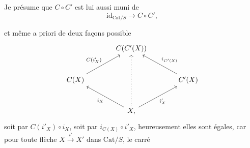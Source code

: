 \documentclass[11pt]{article}
\newcommand{\msp}[1]{\marginpar{\footnotesize [#1]}}
\newcommand{\Cat}{\mathrm{Cat}}
\begin{document}
Je présume que $C \circ C'$ est lui aussi muni de
\[
\mathrm{id}_{\Cat/S} \longrightarrow C \circ C',
\]

\msp{page 197}
et même a priori de deux façons possible
\[
\begin{tikzcd}[column sep=large, row sep=large]
& C(C'(X)) & \\
C(X) \arrow[ur, "C(i'_X)"] & & C'(X) \arrow[ul, "i_{C'(X)}"'] \\
& X, \arrow[ul, "i_X"] \arrow[ur, "i'_X"'] \arrow[uu, dotted] &
\end{tikzcd}
\]
soit par $C(i'_X) \circ i_X$, soit par $i_{C(X)} \circ i'_X$, heureusement elles sont égales, car pour toute flèche $X \xrightarrow{\ i'\ } X'$ dans $\Cat/S$, le carré %
\end{document}
